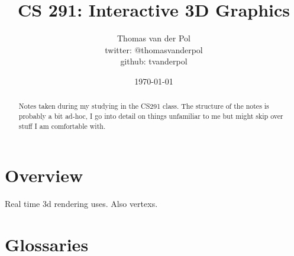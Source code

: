 \documentclass[11pt]{report}
\title{CS 291: Interactive 3D Graphics}
\author{Thomas van der Pol \\
twitter: @thomasvanderpol \\
github: tvanderpol}
\date{\today}                                           %
\begin{document}
\maketitle
\begin{abstract}
Notes taken during my studying in the CS291 class. The structure of the notes is probably a bit ad-hoc, I go into detail on things unfamiliar to me but might skip over stuff I am comfortable with.
\end{abstract}



\tableofcontents

% 

\chapter{Overview}

Real time 3d rendering uses. Also \glspl{vertex}.

\chapter{Glossaries}
\printglossaries
\end{document}
